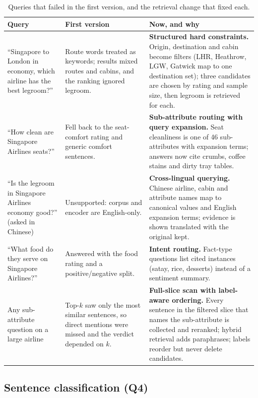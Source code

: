 \documentclass[10pt,twocolumn,a4paper]{article}
\begin{document}
\begin{table}[t]
\centering\small
\caption{Queries that failed in the first version, and the retrieval change that fixed each.}
\label{tab:fixes}
\begin{tabularx}{\textwidth}{@{}P{44mm}YY@{}}
\toprule
\textbf{Query} & \textbf{First version} & \textbf{Now, and why} \\
\midrule
``Singapore to London in economy, which airline has the best legroom?'' &
Route words treated as keywords; results mixed routes and cabins, and the ranking ignored legroom. &
\textbf{Structured hard constraints.} Origin, destination and cabin become filters (LHR, Heathrow, LGW, Gatwick map to one destination set); three candidates are chosen by rating and sample size, then legroom is retrieved for each. \\
``How clean are Singapore Airlines seats?'' &
Fell back to the seat-comfort rating and generic comfort sentences. &
\textbf{Sub-attribute routing with query expansion.} Seat cleanliness is one of 46 sub-attributes with expansion terms; answers now cite crumbs, coffee stains and dirty tray tables. \\
``Is the legroom in Singapore Airlines economy good?'' (asked in Chinese) &
Unsupported: corpus and encoder are English-only. &
\textbf{Cross-lingual querying.} Chinese airline, cabin and attribute names map to canonical values and English expansion terms; evidence is shown translated with the original kept. \\
``What food do they serve on Singapore Airlines?'' &
Answered with the food rating and a positive/negative split. &
\textbf{Intent routing.} Fact-type questions list cited instances (satay, rice, desserts) instead of a sentiment summary. \\
Any sub-attribute question on a large airline &
Top-$k$ saw only the most similar sentences, so direct mentions were missed and the verdict depended on $k$. &
\textbf{Full-slice scan with label-aware ordering.} Every sentence in the filtered slice that names the sub-attribute is collected and reranked; hybrid retrieval adds paraphrases; labels reorder but never delete candidates. \\
\bottomrule
\end{tabularx}
\end{table}

\subsection{Sentence classification (Q4)}
\label{sec:cls}
\end{document}
